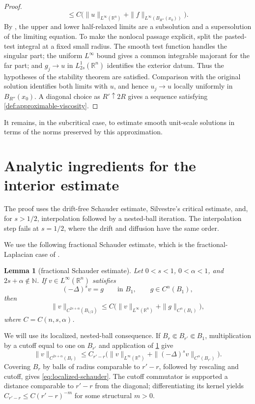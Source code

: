 \documentclass[10pt,a4paper]{amsart}
\numberwithin{equation}{section}
\newtheorem{lemma}[theorem]{Lemma}
\newcommand{\R}{\mathbb R}
\newcommand{\rev}[1]{#1}
\begin{document}
\begin{proof}
\[ \le C\bigl(\|u\|_{L^\infty(\R^n)}+
             \|f\|_{L^\infty(B_{R''}(x_0))}\bigr).
\]
By \cite[Theorem~1]{BarlesImbert2008}, the upper and lower half-relaxed
limits are a subsolution and a supersolution of the limiting equation.  To
make the nonlocal passage explicit, split the pasted-test integral at a fixed
small radius.  The smooth test function handles the singular part; the
uniform $L^\infty$ bound gives a common integrable majorant for the far part;
and $g_j\to u$ in $L^1_{2s}(\R^n)$ identifies the exterior datum.  Thus the
hypotheses of the stability theorem are satisfied.  Comparison with the
original solution identifies both limits with $u$, and hence
$u_j\to u$ locally uniformly in $B_{R''}(x_0)$.
A diagonal choice as $R'\uparrow2R$ gives a sequence satisfying
\cref{def:approximable-viscosity}.
\endgroup
\end{proof}

\rev{It remains, in the subcritical case, to estimate smooth unit-scale
solutions in terms of the norms preserved by this approximation.}

\section{Analytic ingredients for the interior estimate}\label{sec:estimates}

\rev{The proof uses the drift-free Schauder estimate, Silvestre's critical
estimate, and, for $s>1/2$, interpolation followed by a nested-ball
iteration.  The interpolation step fails at $s=1/2$, where the drift and
diffusion have the same order.}

We use the following fractional Schauder estimate, which is the
fractional-Laplacian case of
\cite[Corollary~3.5]{RosOtonSerra2016}.

\begin{lemma}[fractional Schauder estimate]\label{lem:fractional-schauder}
Let $0<s<1$, $0<\alpha<1$, and $2s+\alpha\notin\mathbb N$.  If
$v\in L^\infty(\R^n)$ satisfies
\[
 (-\Delta)^s v=g\qquad\text{in }B_1,
 \qquad g\in C^\alpha(B_1),
\]
then
\begin{equation}\label{eq:pure-schauder}
 \|v\|_{C^{2s+\alpha}(B_{1/2})}
 \le C\bigl(\|v\|_{L^\infty(\R^n)}
             +\|g\|_{C^\alpha(B_1)}\bigr),
\end{equation}
where $C=C(n,s,\alpha)$.
\end{lemma}

We will use its localized, nested-ball consequence.  If
$B_r\Subset B_{r'}\Subset B_1$, multiplication by a cutoff equal to one on
$B_{r'}$ and application of \cref{lem:fractional-schauder} give
\begin{equation}\label{eq:localized-schauder}
 \|v\|_{C^{2s+\alpha}(B_r)}
 \le C_{r'-r}\bigl(
 \|v\|_{L^\infty(\R^n)}
 +\|(-\Delta)^sv\|_{C^\alpha(B_{r'})}\bigr).
\end{equation}
\rev{Covering $B_r$ by balls of radius comparable to $r'-r$, followed by
rescaling and cutoff, gives \eqref{eq:localized-schauder}.  The cutoff
commutator is supported a distance comparable to $r'-r$ from the diagonal;
differentiating its kernel yields
$C_{r'-r}\le C(r'-r)^{-m}$ for some structural $m>0$.}
\end{document}
